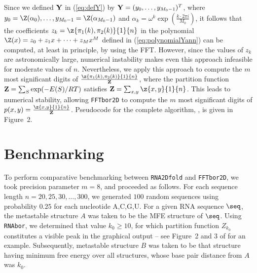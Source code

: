Since we defined $\bf Y$ in (\ref{eq:defY}) by ${\bf Y} =
(y_0,\ldots,y_{M_0-1})^T$, where
$y_0=\Z(\alpha_0),\ldots, y_{M_0-1}=\Z(\alpha_{M_0-1})$ and $\alpha_k = \omega^k
\exp(\frac{k \cdot 2\pi i}{M_0})$,
it follows that the coefficients
$z_k=\z{\pi_1(k),\pi_2(k)}{1}{n}$ in the polynomial
$\Z(x) = z_0 + z_1 x + \cdots + z_{M} x^{M}$ defined in
(\ref{eq:polynomialYann}) can be computed, at least in principle,
by using the FFT. However, since the values of
$z_{k}$ are astronomically large, numerical
instability makes even this approach infeasible for moderate values of $n$.
Nevertheless, we apply this approach to compute the $m$ most significant
digits of $\frac{\z{\pi_1(k),\pi_2(k)}{1}{n}}{{\bf Z}}$,
where the partition function ${\bf Z} = \sum_{S} \exp(-E(S)/RT)$ satisfies
${{\bf Z}} = \sum_{x,y} \z{x,y}{1}{n}$. This leads to numerical stability,
allowing {\tt FFTbor2D} to compute the
$m$ most significant digits of $p(x,y) = \frac{\z{x,y}{1}{n}}{{\bf Z}}$.
Pseudocode for the complete algorithm, \fftbor, is given in
Figure~2.


\section{Benchmarking}
\label{section:benchmarking}

To perform comparative benchmarking between {\tt RNA2Dfold} and {\tt FFTbor2D},
we took precision parameter $m=8$, and proceeded as follows.
For each sequence length $n = 20,25,30,\ldots,300$, we generated
$100$ random sequences using probability $0.25$ for each nucleotide A,C,G,U.
For a given RNA sequence $\seq$, the metastable structure $A$ was
taken to be the MFE structure of $\seq$.
Using {\tt RNAbor}, we determined that value $k_0\geq 10$, for which
partition function $Z_{k_0}$ constitutes a visible peak in the graphical
output -- see Figure~2 and 3 of  \cite{Freyhult.b07} for an example.
Subsequently, metastable structure $B$ was taken to be that structure
having minimum free energy over all structures, whose base pair distance from
$A$ was $k_0$.

